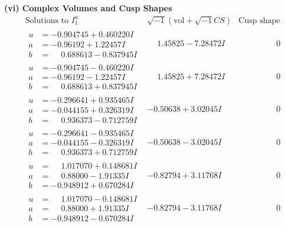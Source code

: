 \documentclass[1p]{elsarticle_modified}
\theoremstyle{definition}
\newcommand{\I}{\sqrt{-1}}
\begin{document}
\newpage\flushleft \textbf{(vi) Complex Volumes and Cusp Shapes}
$$\begin{array}{c|c|c}  
\text{Solutions to }I^u_{1}& \I (\text{vol} + \sqrt{-1}CS) & \text{Cusp shape}\\
 \hline 
\begin{aligned}
u &= -0.904745 + 0.460220 I \\
a &= -0.96192 + 1.22457 I \\
b &= \phantom{-}0.688613 - 0.837945 I\end{aligned}
 & \phantom{-}1.45825 - 7.28472 I & \phantom{-0.000000 } 0 \\ \hline\begin{aligned}
u &= -0.904745 - 0.460220 I \\
a &= -0.96192 - 1.22457 I \\
b &= \phantom{-}0.688613 + 0.837945 I\end{aligned}
 & \phantom{-}1.45825 + 7.28472 I & \phantom{-0.000000 } 0 \\ \hline\begin{aligned}
u &= -0.296641 + 0.935465 I \\
a &= -0.044155 + 0.326319 I \\
b &= \phantom{-}0.936373 - 0.712759 I\end{aligned}
 & -0.50638 + 3.02045 I & \phantom{-0.000000 } 0 \\ \hline\begin{aligned}
u &= -0.296641 - 0.935465 I \\
a &= -0.044155 - 0.326319 I \\
b &= \phantom{-}0.936373 + 0.712759 I\end{aligned}
 & -0.50638 - 3.02045 I & \phantom{-0.000000 } 0 \\ \hline\begin{aligned}
u &= \phantom{-}1.017070 + 0.148681 I \\
a &= \phantom{-}0.88000 - 1.91335 I \\
b &= -0.948912 + 0.670284 I\end{aligned}
 & -0.82794 + 3.11768 I & \phantom{-0.000000 } 0 \\ \hline\begin{aligned}
u &= \phantom{-}1.017070 - 0.148681 I \\
a &= \phantom{-}0.88000 + 1.91335 I \\
b &= -0.948912 - 0.670284 I\end{aligned}
 & -0.82794 - 3.11768 I & \phantom{-0.000000 } 0 \\ \hline\begin{aligned}

\end{aligned}
\end{array}$$
\end{document}
